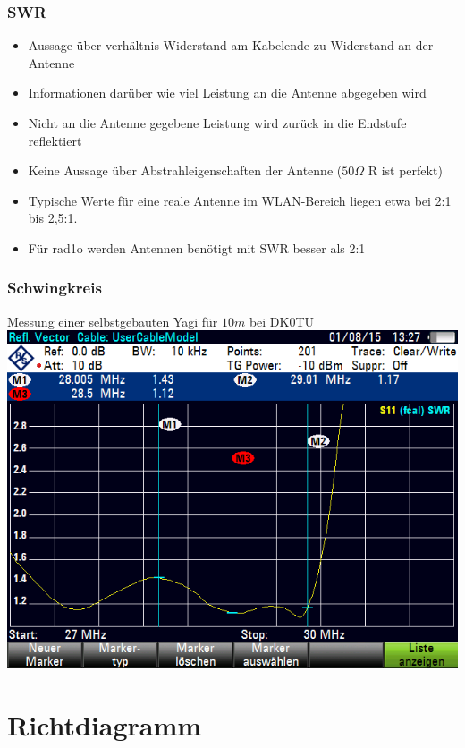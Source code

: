 \begin{frame}
    \frametitle{SWR}
    \begin{center}
	\begin{itemize}
		\item Aussage über verhältnis Widerstand am Kabelende zu Widerstand an der Antenne
		\item Informationen darüber wie viel Leistung an die Antenne abgegeben wird
		\item Nicht an die Antenne gegebene Leistung wird zurück in die Endstufe reflektiert
		\item Keine Aussage über Abstrahleigenschaften der Antenne ($50 \Omega$ R ist perfekt)
		\item Typische Werte für eine reale Antenne im WLAN-Bereich liegen etwa bei 2:1 bis 2,5:1.
		\item Für rad1o werden Antennen benötigt mit SWR besser als 2:1
    \end{itemize}
 	\end{center}
\end{frame}

\begin{frame}
    \frametitle{Schwingkreis}
    \begin{center} \large
    Messung einer selbstgebauten Yagi für $10m$ bei DK0TU
        \includegraphics[width=.9\textwidth]{e11/Measurement0010.png}
	\end{center}
\end{frame}


\section*{Richtdiagramm}

